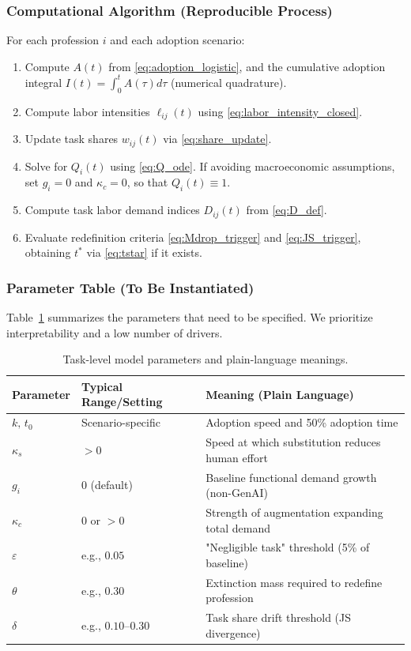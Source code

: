 \subsubsection{Computational Algorithm (Reproducible Process)}
\label{sec:algorithm}
For each profession $i$ and each adoption scenario:
\begin{enumerate}
  \item Compute $A(t)$ from \eqref{eq:adoption_logistic}, and the cumulative adoption integral $I(t)=\int_0^t A(\tau)d\tau$ (numerical quadrature).
  \item Compute labor intensities $\ell_{ij}(t)$ using \eqref{eq:labor_intensity_closed}.
  \item Update task shares $w_{ij}(t)$ via \eqref{eq:share_update}.
  \item Solve for $Q_i(t)$ using \eqref{eq:Q_ode}. If avoiding macroeconomic assumptions, set $g_i=0$ and $\kappa_c=0$, so that $Q_i(t)\equiv 1$.
  \item Compute task labor demand indices $D_{ij}(t)$ from \eqref{eq:D_def}.
  \item Evaluate redefinition criteria \eqref{eq:Mdrop_trigger} and \eqref{eq:JS_trigger}, obtaining $t^*$ via \eqref{eq:tstar} if it exists.
\end{enumerate}

\subsubsection{Parameter Table (To Be Instantiated)}
\label{sec:param_table}
Table~\ref{tab:params_task_model} summarizes the parameters that need to be specified. We prioritize interpretability and a low number of drivers.

\begin{table}[ht]
\centering
\caption{Task-level model parameters and plain-language meanings.}
\label{tab:params_task_model}
\begin{tabular}{lll}
\hline
Parameter & Typical Range/Setting & Meaning (Plain Language) \\
\hline
$k,\,t_0$ & Scenario-specific & Adoption speed and 50\% adoption time \\
$\kappa_s$ & $>0$ & Speed at which substitution reduces human effort \\
$g_i$ & $0$ (default) & Baseline functional demand growth (non-GenAI) \\
$\kappa_c$ & $0$ or $>0$ & Strength of augmentation expanding total demand \\
$\varepsilon$ & e.g., $0.05$ & "Negligible task" threshold (5\% of baseline) \\
$\theta$ & e.g., $0.30$ & Extinction mass required to redefine profession \\
$\delta$ & e.g., $0.10$--$0.30$ & Task share drift threshold (JS divergence) \\
\hline
\end{tabular}
\end{table}

